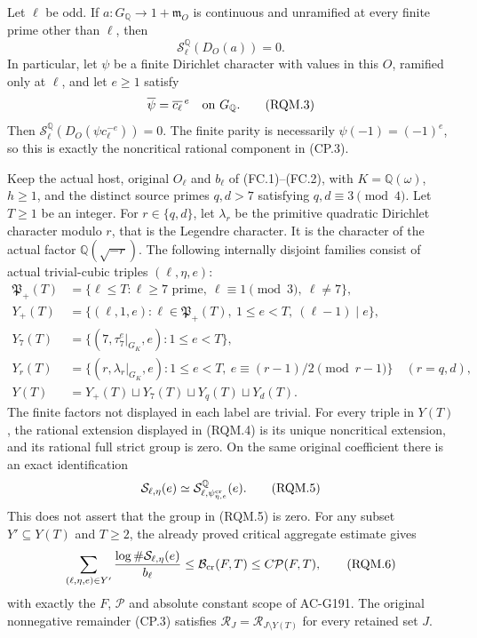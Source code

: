 \begin{theorem}
\label{AC-G195}
Let $\ell$ be odd. If $a:G_{\mathbb Q}\to1+\mathfrak m_O$
is continuous and unramified at every finite prime other than $\ell$,
then
\[
                   \mathcal S^{\mathbb Q}_\ell(D_O(a))=0.
 \tag{RQM.2}
\]
In particular, let $\psi$ be a finite Dirichlet character with values
in this $O$, ramified only at $\ell$, and let $e\geq1$ satisfy
\[
                       \overline\psi=\overline{c_\ell}^{\,e}
                              \quad\hbox{on }G_{\mathbb Q}.
 \tag{RQM.3}
\]
Then $\mathcal S^{\mathbb Q}_\ell(D_O(\psi c_\ell^{-e}))=0$.
The finite parity is necessarily $\psi(-1)=(-1)^e$, so this is
exactly the noncritical rational component in (CP.3).

Keep the actual host, original $O_\ell$ and $b_\ell$ of (FC.1)--(FC.2),
with $K=\mathbb Q(\omega)$, $h\geq1$, and the distinct source primes
$q,d>7$ satisfying $q,d\equiv3\pmod4$. Let $T\geq1$ be an integer.
For $r\in\{q,d\}$, let $\lambda_r$ be the primitive quadratic
Dirichlet character modulo $r$, that is the Legendre character.
It is the character of the actual factor $\mathbb Q(\sqrt{-r})$.
The following internally disjoint families consist of actual
trivial-cubic triples $(\ell,\eta,e)$:
\[
 \begin{aligned}
 \mathfrak P_+(T)&=\{\ell\leq T:\ell\geq7\text{ prime},\
                  \ell\equiv1\pmod3,\ \ell\ne7\},\\
 Y_+(T)&=\{(\ell,1,e):\ell\in\mathfrak P_+(T),\
                        1\leq e<T,\ (\ell-1)\mid e\},\\
 Y_7(T)&=\{(7,\tau_7^e|_{G_K},e):1\leq e<T\},\\
 Y_r(T)&=\{(r,\lambda_r|_{G_K},e):1\leq e<T,\
                    e\equiv(r-1)/2\pmod{r-1}\}\quad(r=q,d),\\
 Y(T)&=Y_+(T)\sqcup Y_7(T)\sqcup Y_q(T)\sqcup Y_d(T).
 \end{aligned}                                                    \tag{RQM.4}
\]
The finite factors not displayed in each label are trivial.
For every triple in $Y(T)$, the rational extension displayed in
(RQM.4) is its unique noncritical extension, and its rational
full strict group is zero. On the same original coefficient there
is an exact identification
\[
 \mathcal S_{\ell,\eta}(e)
       \simeq\mathcal S^{\mathbb Q}_{\ell,
                                  \psi_{\eta,e}^{\rm cr}}(e).
 \tag{RQM.5}
\]
This does not assert that the group in (RQM.5) is zero.
For any subset $Y'\subseteq Y(T)$ and $T\geq2$, the already proved
critical aggregate estimate gives
\[
  \sum_{(\ell,\eta,e)\in Y'}
                \frac{\log\#\mathcal S_{\ell,\eta}(e)}{b_\ell}
          \leq\mathcal B_{\rm cr}(F,T)\leq C\mathcal P(F,T),
 \tag{RQM.6}
\]
with exactly the $F$, $\mathcal P$ and absolute constant scope of
AC-G191. The original nonnegative remainder (CP.3) satisfies
$\mathcal R_J=\mathcal R_{J\setminus Y(T)}$ for every retained set $J$.


\end{theorem}
